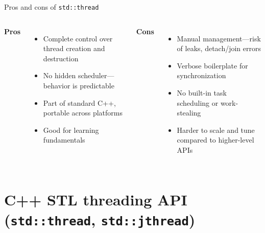 \documentclass{beamer}
\begin{document}
\begin{frame}{Pros and cons of \texttt{std::thread}}
  \begin{columns}
      \textbf{Pros}
      \begin{itemize}
        \item Complete control over thread creation and destruction
        \item No hidden scheduler—behavior is predictable
        \item Part of standard C++, portable across platforms
        \item Good for learning fundamentals
      \end{itemize}
      \textbf{Cons}
      \begin{itemize}
        \item Manual management—risk of leaks, detach/join errors
        \item Verbose boilerplate for synchronization
        \item No built-in task scheduling or work-stealing
        \item Harder to scale and tune compared to higher-level APIs
      \end{itemize}
  \end{columns}
\end{frame}

\section{C++ STL threading API (\texttt{std::thread}, \texttt{std::jthread})}
\end{document}
